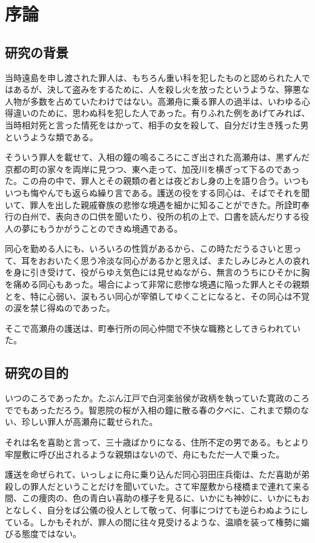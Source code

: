 \section{序論}
\subsection{研究の背景}
当時遠島を申し渡された罪人は、もちろん重い科を犯したものと認められた人ではあるが、決して盗みをするために、人を殺し火を放ったというような、獰悪な人物が多数を占めていたわけではない。高瀬舟に乗る罪人の過半は、いわゆる心得違いのために、思わぬ科を犯した人であった。有りふれた例をあげてみれば、当時相対死と言った情死をはかって、相手の女を殺して、自分だけ生き残った男というような類である。

そういう罪人を載せて、入相の鐘の鳴るころにこぎ出された高瀬舟は、黒ずんだ京都の町の家々を両岸に見つつ、東へ走って、加茂川を横ぎって下るのであった。この舟の中で、罪人とその親類の者とは夜どおし身の上を語り合う。いつもいつも悔やんでも返らぬ繰り言である。護送の役をする同心は、そばでそれを聞いて、罪人を出した親戚眷族の悲惨な境遇を細かに知ることができた。所詮町奉行の白州で、表向きの口供を聞いたり、役所の机の上で、口書を読んだりする役人の夢にもうかがうことのできぬ境遇である。

同心を勤める人にも、いろいろの性質があるから、この時ただうるさいと思って、耳をおおいたく思う冷淡な同心があるかと思えば、またしみじみと人の哀れを身に引き受けて、役がらゆえ気色には見せぬながら、無言のうちにひそかに胸を痛める同心もあった。場合によって非常に悲惨な境遇に陥った罪人とその親類とを、特に心弱い、涙もろい同心が宰領してゆくことになると、その同心は不覚の涙を禁じ得ぬのであった。

そこで高瀬舟の護送は、町奉行所の同心仲間で不快な職務としてきらわれていた。

\subsection{研究の目的}
いつのころであったか。たぶん江戸で白河楽翁侯が政柄を執っていた寛政のころででもあっただろう。智恩院の桜が入相の鐘に散る春の夕べに、これまで類のない、珍しい罪人が高瀬舟に載せられた。

それは名を喜助と言って、三十歳ばかりになる、住所不定の男である。もとより牢屋敷に呼び出されるような親類はないので、舟にもただ一人で乗った。

護送を命ぜられて、いっしょに舟に乗り込んだ同心羽田庄兵衛は、ただ喜助が弟殺しの罪人だということだけを聞いていた。さて牢屋敷から棧橋まで連れて来る間、この痩肉の、色の青白い喜助の様子を見るに、いかにも神妙に、いかにもおとなしく、自分をば公儀の役人として敬って、何事につけても逆らわぬようにしている。しかもそれが、罪人の間に往々見受けるような、温順を装って権勢に媚びる態度ではない。

